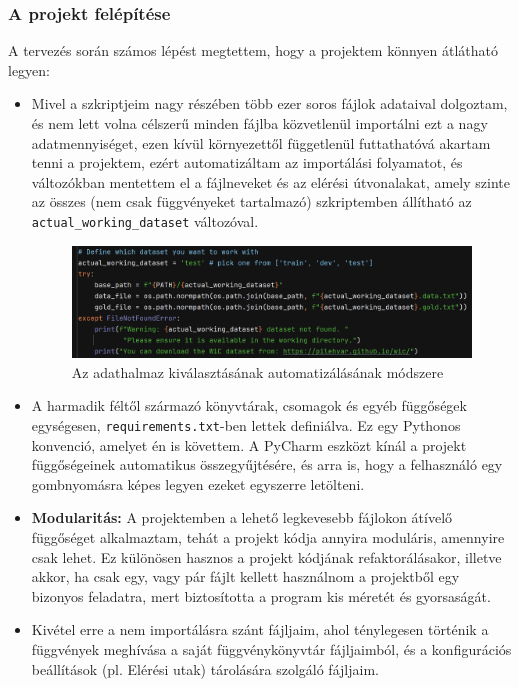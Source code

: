 \documentclass[12pt]{report}
\theoremstyle{definition}
\begin{document}
\subsubsection{A projekt felépítése}
A tervezés során számos lépést megtettem, hogy a projektem könnyen átlátható legyen:
\begin{itemize}

	\item Mivel a szkriptjeim nagy részében több ezer soros fájlok adataival dolgoztam, és nem lett volna célszerű minden fájlba közvetlenül importálni ezt a nagy adatmennyiséget, ezen kívül környezettől függetlenül futtathatóvá akartam tenni a projektem, ezért automatizáltam az importálási folyamatot, és változókban mentettem el a fájlneveket és az elérési útvonalakat, amely szinte az összes (nem csak függvényeket tartalmazó) szkriptemben állítható az \texttt{actual\_working\_dataset} változóval.
	\begin{figure}[H]
		\centering
		\includegraphics[width=1\linewidth]{graphics/automate-choosing-actual-working-dataset.png}
		\caption{Az adathalmaz kiválasztásának automatizálásának módszere}
		\label{fig:enter-label2}
	\end{figure}

	\item A harmadik féltől származó könyvtárak, csomagok és egyéb függőségek egységesen, \texttt{requirements.txt}-ben lettek definiálva. Ez egy Pythonos konvenció, amelyet én is követtem. A PyCharm eszközt kínál a projekt függőségeinek automatikus összegyűjtésére, és arra is, hogy a felhasználó egy gombnyomásra képes legyen ezeket egyszerre letölteni.

	\item \textbf{Modularitás:} A projektemben a lehető legkevesebb fájlokon átívelő függőséget alkalmaztam, tehát a projekt kódja annyira moduláris, amennyire csak lehet. Ez különösen hasznos a projekt kódjának refaktorálásakor, illetve akkor, ha csak egy, vagy pár fájlt kellett használnom a projektből egy bizonyos feladatra, mert biztosította a program kis méretét és gyorsaságát.
	\item
	      Kivétel erre a nem importálásra szánt fájljaim, ahol ténylegesen történik a függvények meghívása a saját függvénykönyvtár fájljaimból, és a konfigurációs beállítások (pl. Elérési utak) tárolására szolgáló fájljaim.
\end{itemize}
\end{document}
